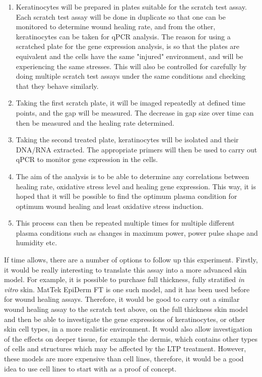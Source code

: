 \documentclass[11pt, oneside]{article}   	%
\begin{document}
\begin{enumerate}
\item Keratinocytes will be prepared in plates suitable for the scratch test assay. 
Each scratch test assay will be done in duplicate so that one can be monitored to determine wound healing rate, and from the other, keratinocytes can be taken for qPCR analysis.
The reason for using a scratched plate for the gene expression analysis, is so that the plates are equivalent and the cells have the same "injured" environment, and will be experiencing the same stresses.
This will also be controlled for carefully by doing multiple scratch test assays under the same conditions and checking that they behave similarly.
\item Taking the first scratch plate, it will be imaged repeatedly at defined time points, and the gap will be measured. The decrease in gap size over time can then be measured and the healing rate determined.
\item Taking the second treated plate, keratinocytes will be isolated and their DNA/RNA extracted.
The appropriate primers will then be used to carry out qPCR to monitor gene expression in the cells.
\item The aim of the analysis is to be able to determine any correlations between healing rate, oxidative stress level and healing gene expression. This way, it is hoped that it will be possible to find the optimum plasma condition for optimum wound healing and least oxidative stress induction.
\item This process can then be repeated multiple times for multiple different plasma conditions such as changes in maximum power, power pulse shape and humidity etc.
\end{enumerate}

If time allows, there are a number of options to follow up this experiment.
Firstly, it would be really interesting to translate this assay into a more advanced skin model.
For example, it is possible to purchase full thickness, fully stratified \textit{in vitro} skin.
MatTek EpiDerm FT \cite{MattekWebsite} is one such model, and it has been used before for wound healing assays.
Therefore, it would be good to carry out a similar wound healing assay to the scratch test above, on the full thickness skin model and then be able to investigate the gene expressions of keratinocytes, or other skin cell types, in a more realistic environment.
It would also allow investigation of the effects on deeper tissue, for example the dermis, which contains other types of cells and structures which may be affected by the LTP treatment.
However, these models are more expensive than cell lines, therefore, it would be a good idea to use cell lines to start with as a proof of concept.
\end{document}
